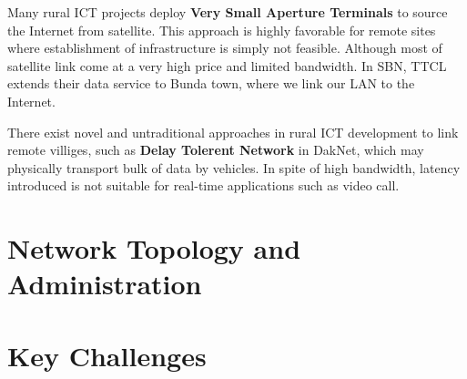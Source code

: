 Many rural ICT projects deploy \textbf{Very Small Aperture Terminals} to source the Internet from satellite. This approach is highly favorable for remote sites where establishment of infrastructure is simply not feasible. Although most of satellite link come at a very high price and limited bandwidth. In SBN, TTCL extends their data service to Bunda town, where we link our LAN to the Internet.

There exist novel and untraditional approaches in rural ICT development to link remote villiges, such as \textbf{Delay Tolerent Network} in DakNet\cite{pentland2004daknet}, which may physically transport bulk of data by vehicles. In spite of high bandwidth, latency introduced is not suitable for real-time applications such as video call.

\section{Network Topology and Administration}


\section{Key Challenges}
